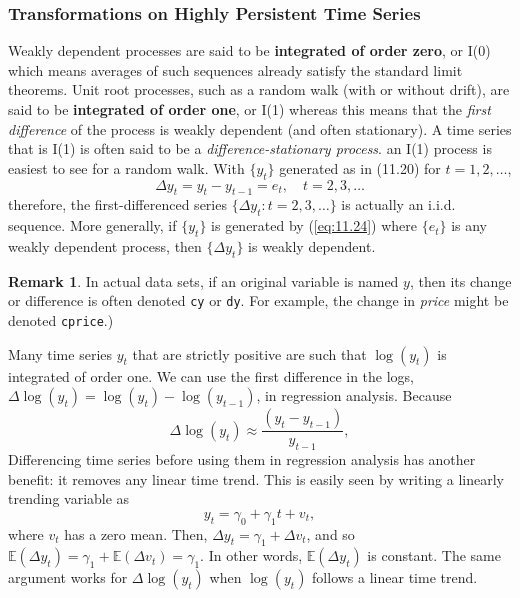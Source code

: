 \documentclass[a4paper, 10pt]{article}
\theoremstyle{definition}	%
\newtheorem*{remark}{Remark}
\begin{document}
\subsubsection{Transformations on Highly Persistent Time Series}
Weakly dependent processes are said to be \textbf{integrated of order zero}, or I(0) which means averages of such sequences already satisfy the standard limit theorems. Unit root processes, such as a random walk (with or without drift), are said to be \textbf{integrated of order one}, or I(1) whereas this means that the \textit{first difference} of the process is weakly dependent (and often stationary). A time series that is I(1) is often said to be a \textit{difference-stationary process}.
an I(1) process is easiest to see for a random walk. With \( \{y_t\} \) generated as in (11.20) for \( t = 1, 2, \ldots \),
\begin{equation}
    \Delta y_t = y_t - y_{t-1} = e_t, \quad t = 2, 3, \ldots \label{eq:11.24}
\end{equation}
therefore, the first-differenced series \( \{\Delta y_t: t = 2, 3, \ldots\} \) is actually an i.i.d. sequence. More generally, if \( \{y_t\} \) is generated by (\ref{eq:11.24}) where \( \{e_t\} \) is any weakly dependent process, then \( \{\Delta y_t\} \) is weakly dependent.
\begin{remark}
    In actual data sets, if an original variable is named \( y \), then its change or difference is often denoted \texttt{cy} or \texttt{dy}. For example, the change in \textit{price} might be denoted \texttt{cprice}.)
\end{remark}
Many time series \( y_t \) that are strictly positive are such that \( \log(y_t) \) is integrated of order one. We can use the first difference in the logs, \( \Delta \log(y_t) = \log(y_t) - \log(y_{t-1}) \), in regression analysis. Because
\begin{equation}
    \Delta \log(y_t) \approx \frac{(y_t - y_{t-1})}{y_{t-1}}, \label{eq:11.25}
\end{equation}
Differencing time series before using them in regression analysis has another benefit: it removes any linear time trend. This is easily seen by writing a linearly trending variable as
\[
y_t = \gamma_0 + \gamma_1 t + v_t,
\]
where \( v_t \) has a zero mean. Then, \( \Delta y_t = \gamma_1 + \Delta v_t \), and so \( \mathbb{E}(\Delta y_t) = \gamma_1 + \mathbb{E}(\Delta v_t) = \gamma_1 \). In other words, \( \mathbb{E}(\Delta y_t) \) is constant. The same argument works for \( \Delta \log(y_t) \) when \( \log(y_t) \) follows a linear time trend.
\end{document}
